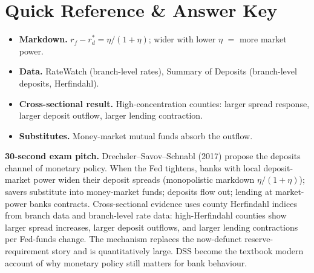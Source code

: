 \documentclass[11pt]{article}
\begin{document}
\section*{Quick Reference \& Answer Key}
\begin{answerbox}
\begin{itemize}
\item \textbf{Markdown.} $r_f-r_d^*=\eta/(1+\eta)$; wider with lower $\eta$ $=$ more market power.
\item \textbf{Data.} RateWatch (branch-level rates), Summary of Deposits (branch-level deposits, Herfindahl).
\item \textbf{Cross-sectional result.} High-concentration counties: larger spread response, larger deposit outflow, larger lending contraction.
\item \textbf{Substitutes.} Money-market mutual funds absorb the outflow.
\end{itemize}
\end{answerbox}

\begin{keybox}
\textbf{30-second exam pitch.} Drechsler--Savov--Schnabl (2017) propose the deposits channel of monetary policy. When the Fed tightens, banks with local deposit-market power widen their deposit spreads (monopolistic markdown $\eta/(1+\eta)$); savers substitute into money-market funds; deposits flow out; lending at market-power banks contracts. Cross-sectional evidence uses county Herfindahl indices from branch data and branch-level rate data: high-Herfindahl counties show larger spread increases, larger deposit outflows, and larger lending contractions per Fed-funds change. The mechanism replaces the now-defunct reserve-requirement story and is quantitatively large. DSS become the textbook modern account of why monetary policy still matters for bank behaviour.
\end{keybox}
\end{document}
